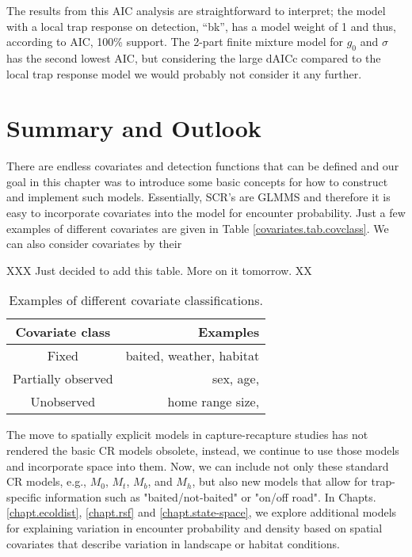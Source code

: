 The results from this AIC analysis are straightforward to interpret; the model
with a local trap response on detection, ``bk'', has a model weight of 1 and thus, according to AIC, 100\% support.
The 2-part finite mixture model for $g_0$ and $\sigma$ has the second lowest
AIC, but considering the large dAICc compared to the local trap response model we would probably not consider it any further.  


\section{Summary and Outlook}

There are endless covariates and detection functions that can be defined
and our goal in this chapter was to introduce some basic concepts for how
to construct and implement such models.  Essentially, SCR's are GLMMS and
therefore it is easy to incorporate covariates into the model for encounter
probability.  Just a few examples of different covariates are given in Table
\ref{covariates.tab.covclass}.  We can also consider covariates by their 

XXX Just decided to add this table.  More on it tomorrow. XX

\begin{table}[ht]
\centering
\caption{Examples of different covariate classifications.}
\begin{tabular}{cr}
\hline
Covariate class & Examples \\
\hline \hline
Fixed & baited, weather, habitat\\
Partially observed & sex, age, \\
Unobserved &  home range size,  \\
\end{tabular}
\label{covariates.tab.covobs}
\end{table}



The move to spatially explicit models in capture-recapture studies has not rendered the
basic CR models \citep{otis_etal:1978}
obsolete, instead, we continue to use those models and incorporate
space into them. Now, we can include not only these standard CR models, 
e.g., $M_0$, $M_t$, $M_b$, and $M_h$, but also new models that allow for trap-specific
information such as "baited/not-baited" or "on/off road".  In
Chapts. \ref{chapt.ecoldist}, \ref{chapt.rsf} and
\ref{chapt.state-space}, we explore additional models 
for explaining variation in encounter probability and density
based on spatial covariates that describe variation in landscape or
habitat conditions. 

